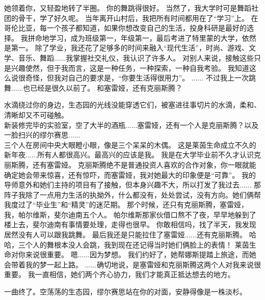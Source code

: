 \documentclass[openany]{book}
\begin{document}
\begin{dialogue}
    她领着你，又轻盈地转了半圈。
     你的舞跳得很好。
     当然了，我大学时可是舞蹈社团的骨干，学了好久呢。
     当年离开山村后，我把所有时间都用在了“学习”上。
     在哥伦比亚，每一个孩子都知道，如果你想改变自己的生活，投身科研是最好的选择。
     我拼命地学习，成为班级第一，年级第一，最后考进了特里蒙的大学，依然是第一。
     除了学业，我还花了足够多的时间来融入“现代生活”，时尚、游戏、文学、音乐、舞蹈......我掌握社交礼仪，我认识了许多人。
     对别人来说，接触这些只是兴趣使然，但于我而言，这是一种任务，一种探索，一种自我考验。
     我知道这么说很奇怪，但我对自己的要求是，“你要生活得很用力”。
     ......
     不过我上一次跳舞......也已经是很久以前了。
     和塞雷娅，还有克丽斯腾？\par
    水滴绕过你的身边，生态园的光线没能穿透它们，被塞进往事切片的水滴，柔和、清晰却又不可碰触。\\
    新装修完毕的实验室，空了大半的酒瓶......塞雷娅，还有一个人是克丽斯腾？以及一脸扫兴的缪尔赛思......\\
    三个人在房间中央大眼瞪小眼，像是三个呆呆的木偶。
     这是莱茵生命成立不久的新年夜......所有人都很高兴。最高兴的应该是我。
     我是在大学毕业前不久才认识克丽斯腾，还有塞雷娅。
     克丽斯腾绝不是普通投资人喜欢的合作对象，你一眼就能确定她会带来惊喜，还有惊吓，而塞雷娅，我对她最大的印象便是“可靠”。
     我的导师意外和她们主持的项目有了接触，但本身兴趣不大，所以打发了我过去......
     那阵子我除了一点用力生活的执拗外，什么都没有，处处尝试，没有方向。她们俩帮我度过了“毕业生”和“精灵”的迷茫期。
     那个时候，还只有克丽斯腾，塞雷娅，我，帕尔维斯，斐尔迪南五个人。
     帕尔维斯那家伙借口熬不了夜，早早地躲到了楼上去，斐尔迪南有事情要处理，走得也很早。
     你敢相信吗，找了半天，我发现居然没有人可以跟我跳舞。
     最后我还是只能拉住了塞雷娅......还有克丽斯腾。
     哈哈，三个人的舞根本没人会跳，我到现在还记得当时她们俩脸上的表情！
     莱茵生命对你来说很重要。
     嗯......因为梦想。
     我们约好了，她帮娜斯提踏上旅途，而她会带着我的梦一起上路。
     ......确切地说，是塞雷娅和克丽斯腾这两个人对我来说很重要。
     我一直相信，她们两个齐心协力，我们才能真正抵达想去的地方。\par
    一曲终了。空荡荡的生态园，缪尔赛思站在你的对面，安静得像是一株淡杉。\\

\end{dialogue}
\end{document}
